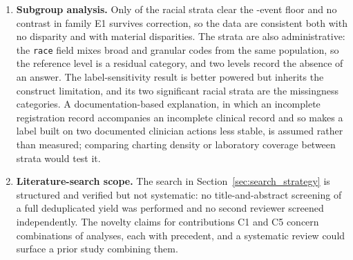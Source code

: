 \begin{enumerate}
    \item \textbf{Subgroup analysis.}\label{lim:subgroup} Only
    \pcNSubgroupsAboveFloor{} of the racial strata clear the
    \pcMinSubgroupEvents{}-event floor and no contrast in family E1 survives
    correction, so the data are consistent both with no disparity and with
    material disparities. The strata are also administrative: the
    \texttt{race} field mixes broad and granular codes from the same
    population, so the reference level is a residual category, and two levels
    record the absence of an answer. The label-sensitivity result is better
    powered but inherits the construct limitation, and its two significant
    racial strata are the missingness categories. A documentation-based
    explanation, in which an incomplete registration record accompanies an
    incomplete clinical record and so makes a label built on two documented
    clinician actions less stable, is assumed rather than measured; comparing
    charting density or laboratory coverage between strata would test it.

    \item \textbf{Literature-search scope.} The search in
    Section~\ref{sec:search_strategy} is structured and verified but not
    systematic: no title-and-abstract screening of a full deduplicated yield
    was performed and no second reviewer screened independently. The novelty
    claims for contributions C1 and C5 concern combinations of analyses, each
    with precedent, and a systematic review could surface a prior study
    combining them.


\end{enumerate}
